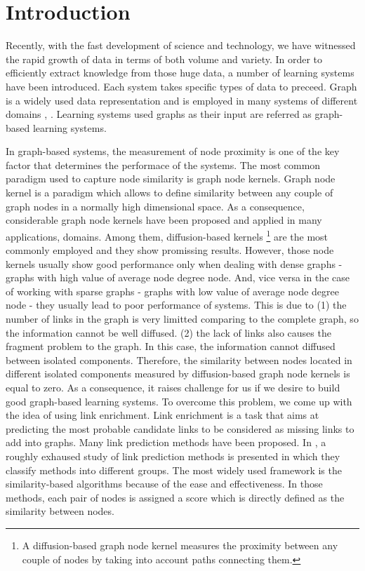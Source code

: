 \documentclass[runningheads,a4paper]{llncs}
\begin{document}
\section{Introduction}

Recently, with the fast development of science and technology, we have witnessed the rapid growth of data in terms of both volume and variety. In order to efficiently extract knowledge from those huge data, a number of learning systems have been introduced. Each system takes specific types of data to preceed. Graph is a widely used data representation and is employed in many systems of different domains \cite{proceeding1}, \cite{jour1}. Learning systems used graphs as their input are referred as graph-based learning systems.

In graph-based systems, the measurement of node proximity is one of the key factor that determines the performace of the systems. The most common paradigm used to capture node similarity is graph node kernels. Graph node kernel is a paradigm which allows to define similarity between any couple of graph nodes in a normally high dimensional space. As a consequence, considerable graph node kernels have been proposed and applied in many applications, domains. Among them, diffusion-based kernels \footnote{A diffusion-based graph node kernel measures the proximity between any couple of nodes by taking into account paths connecting them.} are the most commonly employed and they show promissing results. However, those node kernels usually show good performance only when dealing with dense graphs - graphs with high value of average node degree node. And, vice versa in the case of working with sparse graphs - graphs with low value of average node degree node - they usually lead to poor performance of systems. This is due to (1) the number of links in the graph is very limitted comparing to the complete graph, so the information cannot be well diffused. (2) the lack of links also causes the fragment problem to the graph. In this case, the information cannot diffused between isolated components. Therefore, the similarity between nodes located in different isolated components measured by diffusion-based graph node kernels is equal to zero. As a consequence, it raises challenge for us if we desire to build good graph-based learning systems. To overcome this problem, we come up with the idea of using link enrichment. Link enrichment is a task that aims at predicting the most probable candidate links to be considered as missing links to add into graphs. Many link prediction methods have been proposed. In \cite{jour2}, a roughly exhaused study of link prediction methods is presented in which they classify methods into different groups. The most widely used framework is the similarity-based algorithms because of the ease and effectiveness. In those methods, each pair of nodes is assigned a score which is directly defined as the similarity between nodes.
\end{document}
